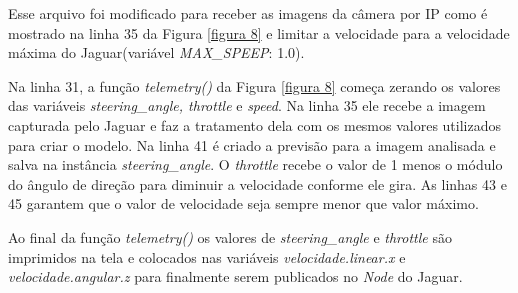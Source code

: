 Esse arquivo foi modificado para receber as imagens da câmera por IP como é mostrado na linha 35 da Figura \ref{figura 8} e limitar a velocidade para a velocidade máxima do Jaguar(variável \textit{MAX\_SPEEP}: 1.0).

\begin{figure}[H]
	\centering
\end{figure}

Na linha 31, a função \textit{telemetry()} da Figura \ref{figura 8} começa zerando os valores das variáveis \textit{steering\_angle, throttle} e \textit{speed}. Na linha 35 ele recebe a imagem capturada pelo Jaguar e faz a tratamento dela com os mesmos valores utilizados para criar o modelo. Na linha 41 é criado a previsão para a imagem analisada e salva na instância \textit{steering\_angle}. O \textit{throttle} recebe o valor de 1 menos o módulo do ângulo de direção para diminuir a velocidade conforme ele gira. As linhas 43 e 45 garantem que o valor de velocidade seja sempre menor que valor máximo.

Ao final da função \textit{telemetry()} os valores de \textit{steering\_angle} e \textit{throttle} são imprimidos na tela e colocados nas variáveis \textit{velocidade.linear.x} e \textit{velocidade.angular.z} para finalmente serem publicados no  \textit{Node} do Jaguar.
